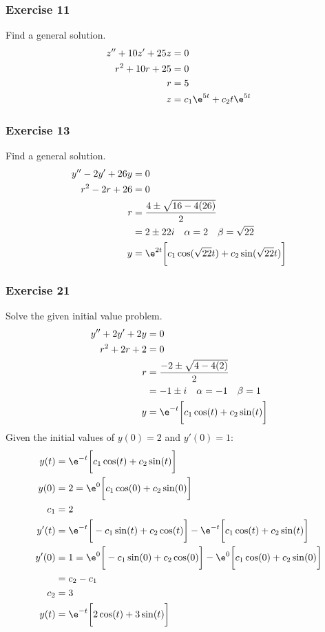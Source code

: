 \documentclass{math}
\begin{document}
\subsubsection*{Exercise 11}
Find a general solution.
\begin{align*}
  z''+10z'+25z &= 0 \\
  r^2+10r+25 &= 0 \\
  r &= 5 \\
  z &= c_1\e^{5t}+c_2t\e^{5t}
\end{align*}

\subsubsection*{Exercise 13}
Find a general solution.
\begin{align*}
  y''-2y'+26y &= 0 \\
  r^2-2r+26 &= 0 \\
  r &= \frac{4\pm\sqrt{16-4(26)}}{2} \\
  &= 2\pm22i \quad \alpha = 2 \quad \beta = \sqrt{22} \\
  y &= \e^{2t}\bigg[c_1\cos(\sqrt{22}t)+c_2\sin(\sqrt{22}t)\bigg]
\end{align*}

\subsubsection*{Exercise 21}
Solve the given initial value problem.
\begin{align*}
  y''+2y'+2y &= 0 \\
  r^2+2r+2 &= 0 \\
  r &= \frac{-2\pm\sqrt{4-4(2)}}{2} \\
  &= -1\pm i \quad \alpha = -1 \quad \beta = 1 \\
  y &= \e^{-t}\bigg[c_1\cos(t)+c_2\sin(t)\bigg] \\
\end{align*}
Given the initial values of \( y(0) = 2 \) and \( y'(0) = 1 \):
\begin{align*}
  y(t) &= \e^{-t}\bigg[c_1\cos(t)+c_2\sin(t)\bigg] \\
  y(0) &= 2 = \e^{0}\bigg[c_1\cos(0)+c_2\sin(0)\bigg] \\
  c_1 &= 2 \\
  y'(t) &= \e^{-t}\bigg[-c_1\sin(t)+c_2\cos(t)\bigg]-
    \e^{-t}\bigg[c_1\cos(t)+c_2\sin(t)\bigg] \\
  y'(0) &= 1 = \e^{0}\bigg[-c_1\sin(0)+c_2\cos(0)\bigg]-
    \e^{0}\bigg[c_1\cos(0)+c_2\sin(0)\bigg] \\
    &= c_2-c_1 \\
  c_2 &= 3 \\
  y(t) &= \e^{-t}\bigg[2\cos(t)+3\sin(t)\bigg]
\end{align*}
\end{document}
